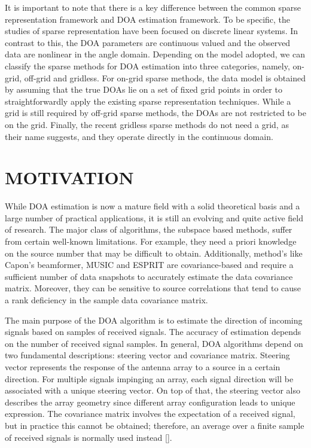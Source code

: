 \documentclass[12pt,a4paper]{article}
\theoremstyle{plain}
\theoremstyle{definition}
\begin{document}
It is important to note that there is a key difference between the common sparse representation framework and DOA estimation framework. To be specific, the studies of sparse representation have been focused on discrete linear systems. In contrast to this, the DOA parameters are continuous valued and the observed data are nonlinear in the angle domain. Depending on the model adopted, we can classify the sparse methods for DOA estimation into three categories, namely, on-grid, off-grid and gridless. For on-grid sparse methods, the data model is obtained by assuming that the true DOAs lie on a set of fixed grid points in order to straightforwardly apply the existing sparse representation techniques. While a grid is still required by off-grid sparse methods, the DOAs are not restricted to be on the grid. Finally, the recent gridless sparse methods do not need a grid, as their name suggests, and they operate directly in the continuous domain.

\section{MOTIVATION}
While DOA estimation is now a mature field with a solid theoretical basis and a large number of practical applications, it is still an evolving and quite active field of research. The major class of algorithms, the subspace based methods, suffer from certain well-known limitations. For example, they need a priori knowledge on the source number that may be difficult to obtain. Additionally, method's like Capon’s beamformer, MUSIC and ESPRIT are covariance-based and require a sufficient number of data snapshots to accurately estimate the data covariance matrix. Moreover, they can be sensitive to source correlations that tend to cause a rank deficiency in the sample data covariance matrix.

The main purpose of the DOA algorithm is to estimate the direction of incoming signals based on samples of received signals. The accuracy of estimation depends on the number of received signal samples. In general, DOA algorithms depend on two fundamental descriptions: steering vector and covariance matrix. Steering vector represents the response of the antenna array to a source in a certain direction. For multiple signals impinging an array, each signal direction will be associated with a unique steering vector. On top of that, the steering vector also describes the array geometry since different array configuration leads to unique expression. The covariance matrix involves the expectation of a received signal, but in practice this cannot be obtained; therefore, an average over a finite sample of received signals is normally used instead [\citet{R13}].
\end{document}

